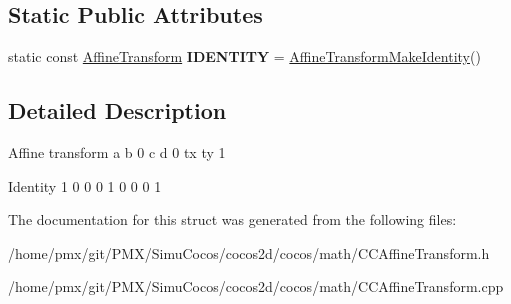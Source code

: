 \subsection*{Static Public Attributes}
\begin{DoxyCompactItemize}
\item 
\mbox{\label{structAffineTransform_a9fd2c32210c9c5a86ecd4e6022ce19ab}} 
static const \hyperlink{structAffineTransform}{Affine\+Transform} {\bfseries I\+D\+E\+N\+T\+I\+TY} = \hyperlink{group__base_ga7b484613387f6495c8efc75123f9c347}{Affine\+Transform\+Make\+Identity}()
\end{DoxyCompactItemize}


\subsection{Detailed Description}
Affine transform a b 0 c d 0 tx ty 1

Identity 1 0 0 0 1 0 0 0 1 

The documentation for this struct was generated from the following files\+:\begin{DoxyCompactItemize}
\item 
/home/pmx/git/\+P\+M\+X/\+Simu\+Cocos/cocos2d/cocos/math/C\+C\+Affine\+Transform.\+h\item 
/home/pmx/git/\+P\+M\+X/\+Simu\+Cocos/cocos2d/cocos/math/C\+C\+Affine\+Transform.\+cpp\end{DoxyCompactItemize}
